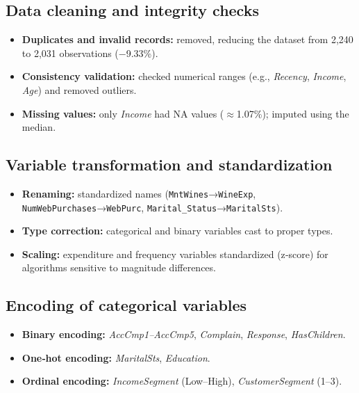 \subsection{Data cleaning and integrity checks}

\begin{itemize}[leftmargin=1.2cm]
    \item \textbf{Duplicates and invalid records:} removed, reducing the dataset
    from 2,240 to 2,031 observations (−9.33\%).
    \item \textbf{Consistency validation:} checked numerical ranges (e.g.,
    \textit{Recency}, \textit{Income}, \textit{Age}) and removed outliers.
    \item \textbf{Missing values:} only \textit{Income} had NA values
    ($\approx$1.07\%); imputed using the median.
\end{itemize}

\subsection{Variable transformation and standardization}

\begin{itemize}[leftmargin=1.2cm]
    \item \textbf{Renaming:} standardized names
    (\texttt{MntWines}→\texttt{WineExp}, \texttt{NumWebPurchases}→\texttt{WebPurc},
    \texttt{Marital\_Status}→\texttt{MaritalSts}).
    \item \textbf{Type correction:} categorical and binary variables cast to proper types.
    \item \textbf{Scaling:} expenditure and frequency variables standardized (z‐score)
    for algorithms sensitive to magnitude differences.
\end{itemize}

\subsection{Encoding of categorical variables}

\begin{itemize}[leftmargin=1.2cm]
    \item \textbf{Binary encoding:} \textit{AccCmp1–AccCmp5}, \textit{Complain},
    \textit{Response}, \textit{HasChildren}.
    \item \textbf{One‐hot encoding:} \textit{MaritalSts}, \textit{Education}.
    \item \textbf{Ordinal encoding:} \textit{IncomeSegment} (Low–High),
    \textit{CustomerSegment} (1–3).
\end{itemize}

